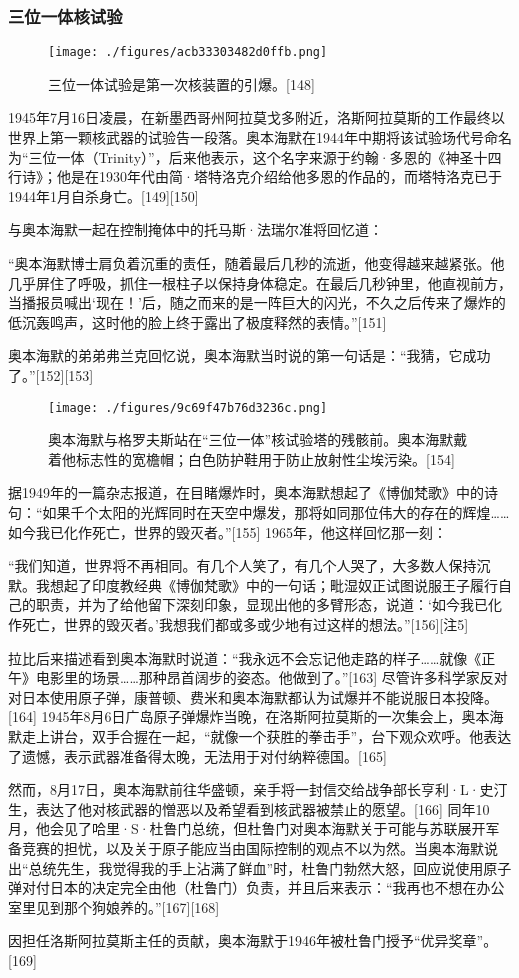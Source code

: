 \subsubsection{三位一体核试验}
\begin{figure}[ht]
\centering
\texttt{[image: ./figures/acb33303482d0ffb.png]}
\caption{三位一体试验是第一次核装置的引爆。[148]} \label{fig_ABHM_7}
\end{figure}
1945年7月16日凌晨，在新墨西哥州阿拉莫戈多附近，洛斯阿拉莫斯的工作最终以世界上第一颗核武器的试验告一段落。奥本海默在1944年中期将该试验场代号命名为“三位一体（Trinity）”，后来他表示，这个名字来源于约翰·多恩的《神圣十四行诗》；他是在1930年代由简·塔特洛克介绍给他多恩的作品的，而塔特洛克已于1944年1月自杀身亡。[149][150]

与奥本海默一起在控制掩体中的托马斯·法瑞尔准将回忆道：

“奥本海默博士肩负着沉重的责任，随着最后几秒的流逝，他变得越来越紧张。他几乎屏住了呼吸，抓住一根柱子以保持身体稳定。在最后几秒钟里，他直视前方，当播报员喊出‘现在！’后，随之而来的是一阵巨大的闪光，不久之后传来了爆炸的低沉轰鸣声，这时他的脸上终于露出了极度释然的表情。”[151]

奥本海默的弟弟弗兰克回忆说，奥本海默当时说的第一句话是：“我猜，它成功了。”[152][153]
\begin{figure}[ht]
\centering
\texttt{[image: ./figures/9c69f47b76d3236c.png]}
\caption{奥本海默与格罗夫斯站在“三位一体”核试验塔的残骸前。奥本海默戴着他标志性的宽檐帽；白色防护鞋用于防止放射性尘埃污染。[154]} \label{fig_ABHM_8}
\end{figure}
据1949年的一篇杂志报道，在目睹爆炸时，奥本海默想起了《博伽梵歌》中的诗句：“如果千个太阳的光辉同时在天空中爆发，那将如同那位伟大的存在的辉煌……如今我已化作死亡，世界的毁灭者。”[155] 1965年，他这样回忆那一刻：

“我们知道，世界将不再相同。有几个人笑了，有几个人哭了，大多数人保持沉默。我想起了印度教经典《博伽梵歌》中的一句话；毗湿奴正试图说服王子履行自己的职责，并为了给他留下深刻印象，显现出他的多臂形态，说道：‘如今我已化作死亡，世界的毁灭者。’我想我们都或多或少地有过这样的想法。”[156][注5]

拉比后来描述看到奥本海默时说道：“我永远不会忘记他走路的样子……就像《正午》电影里的场景……那种昂首阔步的姿态。他做到了。”[163] 尽管许多科学家反对对日本使用原子弹，康普顿、费米和奥本海默都认为试爆并不能说服日本投降。[164] 1945年8月6日广岛原子弹爆炸当晚，在洛斯阿拉莫斯的一次集会上，奥本海默走上讲台，双手合握在一起，“就像一个获胜的拳击手”，台下观众欢呼。他表达了遗憾，表示武器准备得太晚，无法用于对付纳粹德国。[165]

然而，8月17日，奥本海默前往华盛顿，亲手将一封信交给战争部长亨利·L·史汀生，表达了他对核武器的憎恶以及希望看到核武器被禁止的愿望。[166] 同年10月，他会见了哈里·S·杜鲁门总统，但杜鲁门对奥本海默关于可能与苏联展开军备竞赛的担忧，以及关于原子能应当由国际控制的观点不以为然。当奥本海默说出“总统先生，我觉得我的手上沾满了鲜血”时，杜鲁门勃然大怒，回应说使用原子弹对付日本的决定完全由他（杜鲁门）负责，并且后来表示：“我再也不想在办公室里见到那个狗娘养的。”[167][168]

因担任洛斯阿拉莫斯主任的贡献，奥本海默于1946年被杜鲁门授予“优异奖章”。[169]

